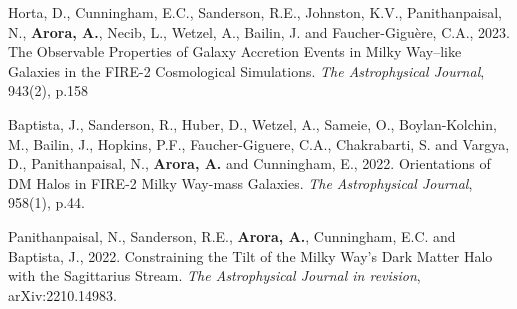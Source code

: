 \documentclass[UTF8]{article}
\begin{document}
\begin{etaremune}
\item Horta, D., Cunningham, E.C., Sanderson, R.E., Johnston, K.V., Panithanpaisal, N., \textbf{Arora, A.}, Necib, L., Wetzel, A., Bailin, J. and Faucher-Giguère, C.A., 2023. The Observable Properties of Galaxy Accretion Events in Milky Way–like Galaxies in the FIRE-2 Cosmological Simulations. \textit{The Astrophysical Journal}, 943(2), p.158

\item Baptista, J., Sanderson, R., Huber, D., Wetzel, A., Sameie, O., Boylan-Kolchin, M., Bailin, J., Hopkins, P.F., Faucher-Giguere, C.A., Chakrabarti, S. and Vargya, D., Panithanpaisal, N., \textbf{Arora, A.} and Cunningham, E., 2022. Orientations of DM Halos in FIRE-2 Milky Way-mass Galaxies. \textit{The Astrophysical Journal}, 958(1), p.44.

\item Panithanpaisal, N., Sanderson, R.E., \textbf{Arora, A.}, Cunningham, E.C. and Baptista, J., 2022. Constraining the Tilt of the Milky Way's Dark Matter Halo with the Sagittarius Stream. \textit{The Astrophysical Journal in revision},  arXiv:2210.14983.


\end{etaremune}
\end{document}
